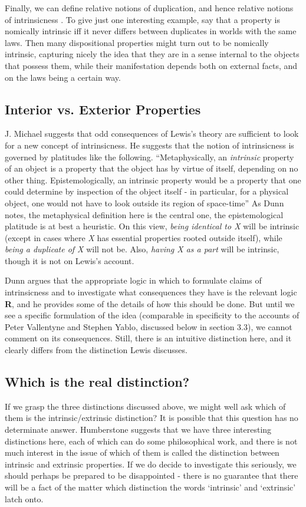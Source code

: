 Finally, we can define relative notions of duplication, and hence relative notions of intrinsicness \cite[238]{Humberstone1996}. To give just one interesting example, say that a property is nomically intrinsic iff it never differs between duplicates in worlds with the same laws. Then many dispositional properties might turn out to be nomically intrinsic, capturing nicely the idea that they are in a sense internal to the objects that possess them, while their manifestation depends both on external facts, and on the laws being a certain way.

\subsection{Interior vs. Exterior Properties}
J. Michael \citet{Dunn1990} suggests that odd consequences of Lewis's theory are sufficient to look for a new concept of intrinsicness. He suggests that the notion of intrinsicness is governed by platitudes like the following. ``Metaphysically, an \textit{intrinsic} property of an object is a property that the object has by virtue of itself, depending on no other thing. Epistemologically, an intrinsic property would be a property that one could determine by inspection of the object itself - in particular, for a physical object, one would not have to look outside its region of space-time'' \citeyearpar[178]{Dunn1990} As Dunn notes, the metaphysical definition here is the central one, the epistemological platitude is at best a heuristic. On this view, \textit{being identical to X} will be intrinsic (except in cases where \textit{X} has essential properties rooted outside itself), while \textit{being a duplicate of X} will not be. Also, \textit{having X as a part} will be intrinsic, though it is not on Lewis's account.

Dunn argues that the appropriate logic in which to formulate claims of intrinsicness and to investigate what consequences they have is the relevant logic \textbf{R}, and he provides some of the details of how this should be done. But until we see a specific formulation of the idea (comparable in specificity to the accounts of Peter Vallentyne and Stephen Yablo, discussed below in section 3.3), we cannot comment on its consequences. Still, there is an intuitive distinction here, and it clearly differs from the distinction Lewis discusses.

\subsection{Which is the real distinction?}
If we grasp the three distinctions discussed above, we might well ask which of them is the intrinsic/extrinsic distinction? It is possible that this question has no determinate answer. Humberstone suggests that we have three interesting distinctions here, each of which can do some philosophical work, and there is not much interest in the issue of which of them is called the distinction between intrinsic and extrinsic properties. If we do decide to investigate this seriously, we should perhaps be prepared to be disappointed - there is no guarantee that there will be a fact of the matter which distinction the words `intrinsic' and `extrinsic' latch onto.

